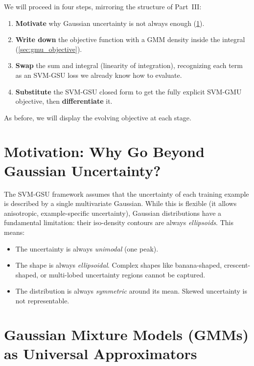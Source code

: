 \documentclass[11pt, letterpaper]{article}
\begin{document}
\begin{statusbox}
We will proceed in four steps, mirroring the structure of Part~III:
\begin{enumerate}[leftmargin=1.5em, topsep=2pt, itemsep=1pt]
    \item \textbf{Motivate} why Gaussian uncertainty is not always enough (\cref{sec:gmu_motivation}).
    \item \textbf{Write down} the objective function with a GMM density inside the integral (\cref{sec:gmu_objective}).
    \item \textbf{Swap} the sum and integral (linearity of integration), recognizing each term as an SVM-GSU loss we already know how to evaluate.
    \item \textbf{Substitute} the SVM-GSU closed form to get the fully explicit SVM-GMU objective, then \textbf{differentiate} it.
\end{enumerate}
As before, we will display the evolving objective at each stage.
\end{statusbox}

\section{Motivation: Why Go Beyond Gaussian Uncertainty?}\label{sec:gmu_motivation}

The SVM-GSU framework assumes that the uncertainty of each training example is described by a single multivariate Gaussian. While this is flexible (it allows anisotropic, example-specific uncertainty), Gaussian distributions have a fundamental limitation: their iso-density contours are always \emph{ellipsoids}. This means:
\begin{itemize}[leftmargin=2em]
    \item The uncertainty is always \emph{unimodal} (one peak).
    \item The shape is always \emph{ellipsoidal}. Complex shapes like banana-shaped, crescent-shaped, or multi-lobed uncertainty regions cannot be captured.
    \item The distribution is always \emph{symmetric} around its mean. Skewed uncertainty is not representable.
\end{itemize}

\section{Gaussian Mixture Models (GMMs) as Universal Approximators}
\end{document}
